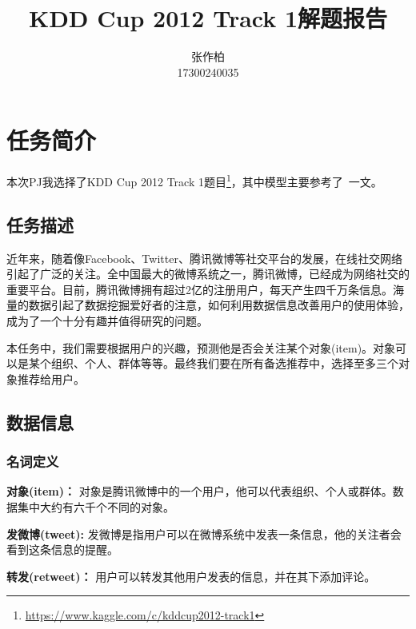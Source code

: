 \documentclass[12pt]{article} %
\title{\textbf{KDD Cup 2012 Track 1解题报告}}
\author{张作柏\\17300240035}
\begin{document}
\begin{sloppypar}
\maketitle

\pagestyle{fancy}
\lhead{\textbf{{\thetitle}}}
\rhead{\textbf{\nouppercase{\firstleftmark}}}
\cfoot{\thepage}

\thispagestyle{empty}
\tableofcontents
\clearpage

\setcounter{page}{1}


\section{任务简介}

本次PJ我选择了KDD Cup 2012 Track 1题目\footnote{\url{https://www.kaggle.com/c/kddcup2012-track1}}，其中模型主要参考了~\cite{chen2012context}一文。

\subsection{任务描述}

近年来，随着像Facebook、Twitter、腾讯微博等社交平台的发展，在线社交网络引起了广泛的关注。全中国最大的微博系统之一，腾讯微博，已经成为网络社交的重要平台。目前，腾讯微博拥有超过2亿的注册用户，每天产生四千万条信息。海量的数据引起了数据挖掘爱好者的注意，如何利用数据信息改善用户的使用体验，成为了一个十分有趣并值得研究的问题。

本任务中，我们需要根据用户的兴趣，预测他是否会关注某个对象(item)。对象可以是某个组织、个人、群体等等。最终我们要在所有备选推荐中，选择至多三个对象推荐给用户。

\subsection{数据信息}

\subsubsection{名词定义}

{\bf 对象(item)：} 对象是腾讯微博中的一个用户，他可以代表组织、个人或群体。数据集中大约有六千个不同的对象。

{\bf 发微博(tweet):} 发微博是指用户可以在微博系统中发表一条信息，他的关注者会看到这条信息的提醒。

{\bf 转发(retweet)：} 用户可以转发其他用户发表的信息，并在其下添加评论。


\end{sloppypar}
\end{document}
